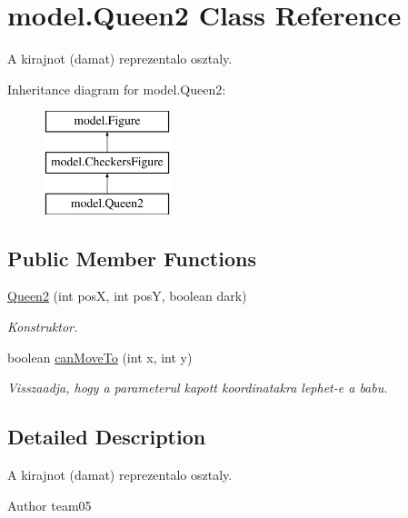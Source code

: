 \hypertarget{classmodel_1_1_queen2}{}\section{model.\+Queen2 Class Reference}
\label{classmodel_1_1_queen2}


A kirajnot (damat) reprezentalo osztaly.  


Inheritance diagram for model.\+Queen2\+:\begin{figure}[H]
\begin{center}
\leavevmode
\includegraphics[height=3.000000cm]{classmodel_1_1_queen2}
\end{center}
\end{figure}
\subsection*{Public Member Functions}
\begin{DoxyCompactItemize}
\item 
\hyperlink{classmodel_1_1_queen2_a789867bf846c7ea756dff018e38fe5db}{Queen2} (int pos\+X, int pos\+Y, boolean dark)
\begin{DoxyCompactList}\small\item\em Konstruktor. \end{DoxyCompactList}\item 
boolean \hyperlink{classmodel_1_1_queen2_af7caf10d17bb953cf310f17c2ace0ccf}{can\+Move\+To} (int x, int y)
\begin{DoxyCompactList}\small\item\em Visszaadja, hogy a parameterul kapott koordinatakra lephet-\/e a babu. \end{DoxyCompactList}\end{DoxyCompactItemize}


\subsection{Detailed Description}
A kirajnot (damat) reprezentalo osztaly. 

\begin{DoxyAuthor}{Author}
team05 
\end{DoxyAuthor}


